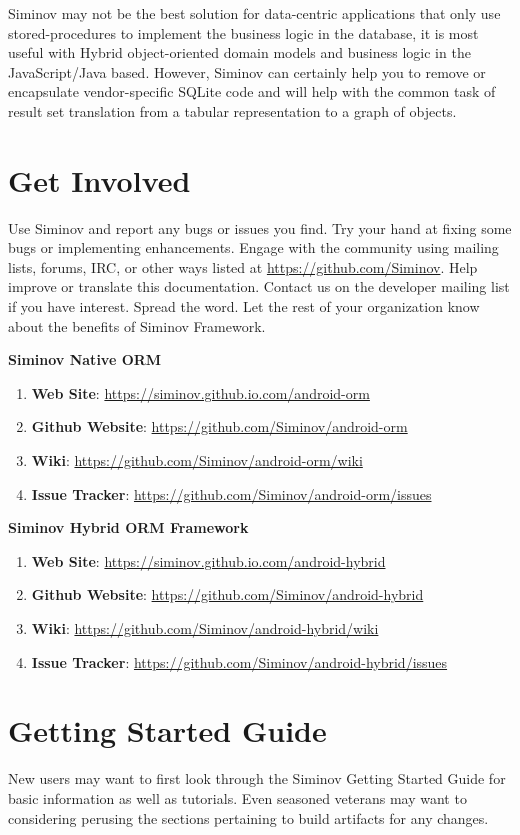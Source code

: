 Siminov may not be the best solution for data-centric applications that only use stored-procedures to implement the business logic in the database, it is most useful with Hybrid object-oriented domain models and business logic in the JavaScript/Java based. However, Siminov can certainly help you to remove or encapsulate vendor-specific SQLite code and will help with the common task of result set translation from a tabular representation to a graph of objects.



\section{Get Involved}

Use Siminov and report any bugs or issues you find. Try your hand at fixing some bugs or implementing enhancements. Engage with the community using mailing lists, forums, IRC, or other ways listed at \url{https://github.com/Siminov}. Help improve or translate this documentation. Contact us on the developer mailing list if you have interest. Spread the word. Let the rest of your organization know about the benefits of Siminov Framework.

\textbf{\large{Siminov Native ORM}}

\begin{enumerate} 

	\item \textbf{Web Site}: \url{https://siminov.github.io.com/android-orm} 
	
	\item \textbf{Github Website}: \url{https://github.com/Siminov/android-orm} 

	\item \textbf{Wiki}: \url{https://github.com/Siminov/android-orm/wiki}

	\item \textbf{Issue Tracker}: \url{https://github.com/Siminov/android-orm/issues} 

\end{enumerate}



\textbf{\large{Siminov Hybrid ORM Framework}} 

\begin{enumerate} 
	
	\item \textbf{Web Site}: \url{https://siminov.github.io.com/android-hybrid} 

	\item \textbf{Github Website}: \url{https://github.com/Siminov/android-hybrid} 

	\item \textbf{Wiki}: \url{https://github.com/Siminov/android-hybrid/wiki}

	\item \textbf{Issue Tracker}: \url{https://github.com/Siminov/android-hybrid/issues} 

\end{enumerate}




\section{Getting Started Guide}

New users may want to first look through the Siminov Getting Started Guide for basic information as well as tutorials. Even seasoned veterans may want to considering perusing the sections pertaining to build artifacts for any changes.


